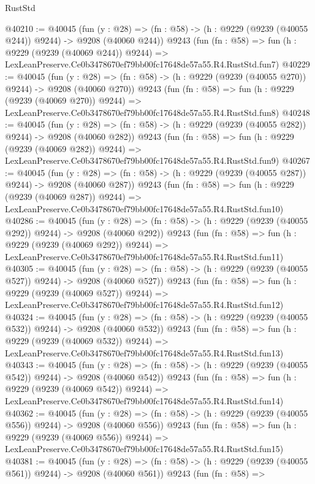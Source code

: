 \begin{lexlean}{RustStd}
\begin{coremodule}
@40210 := @40045
    (fun (y : @28) => (fn : @58) -> (h : @9229 (@9239 (@40055 @244)) @9244) -> @9208 (@40060 @244))
    @9243
    (fun (fn : @58) =>
    fun (h : @9229 (@9239 (@40069 @244)) @9244) =>
    LexLeanPreserve.Ce0b3478670ef79bb00fc17648de57a55.R4.RustStd.fun7)
@40229 := @40045
    (fun (y : @28) => (fn : @58) -> (h : @9229 (@9239 (@40055 @270)) @9244) -> @9208 (@40060 @270))
    @9243
    (fun (fn : @58) =>
    fun (h : @9229 (@9239 (@40069 @270)) @9244) =>
    LexLeanPreserve.Ce0b3478670ef79bb00fc17648de57a55.R4.RustStd.fun8)
@40248 := @40045
    (fun (y : @28) => (fn : @58) -> (h : @9229 (@9239 (@40055 @282)) @9244) -> @9208 (@40060 @282))
    @9243
    (fun (fn : @58) =>
    fun (h : @9229 (@9239 (@40069 @282)) @9244) =>
    LexLeanPreserve.Ce0b3478670ef79bb00fc17648de57a55.R4.RustStd.fun9)
@40267 := @40045
    (fun (y : @28) => (fn : @58) -> (h : @9229 (@9239 (@40055 @287)) @9244) -> @9208 (@40060 @287))
    @9243
    (fun (fn : @58) =>
    fun (h : @9229 (@9239 (@40069 @287)) @9244) =>
    LexLeanPreserve.Ce0b3478670ef79bb00fc17648de57a55.R4.RustStd.fun10)
@40286 := @40045
    (fun (y : @28) => (fn : @58) -> (h : @9229 (@9239 (@40055 @292)) @9244) -> @9208 (@40060 @292))
    @9243
    (fun (fn : @58) =>
    fun (h : @9229 (@9239 (@40069 @292)) @9244) =>
    LexLeanPreserve.Ce0b3478670ef79bb00fc17648de57a55.R4.RustStd.fun11)
@40305 := @40045
    (fun (y : @28) => (fn : @58) -> (h : @9229 (@9239 (@40055 @527)) @9244) -> @9208 (@40060 @527))
    @9243
    (fun (fn : @58) =>
    fun (h : @9229 (@9239 (@40069 @527)) @9244) =>
    LexLeanPreserve.Ce0b3478670ef79bb00fc17648de57a55.R4.RustStd.fun12)
@40324 := @40045
    (fun (y : @28) => (fn : @58) -> (h : @9229 (@9239 (@40055 @532)) @9244) -> @9208 (@40060 @532))
    @9243
    (fun (fn : @58) =>
    fun (h : @9229 (@9239 (@40069 @532)) @9244) =>
    LexLeanPreserve.Ce0b3478670ef79bb00fc17648de57a55.R4.RustStd.fun13)
@40343 := @40045
    (fun (y : @28) => (fn : @58) -> (h : @9229 (@9239 (@40055 @542)) @9244) -> @9208 (@40060 @542))
    @9243
    (fun (fn : @58) =>
    fun (h : @9229 (@9239 (@40069 @542)) @9244) =>
    LexLeanPreserve.Ce0b3478670ef79bb00fc17648de57a55.R4.RustStd.fun14)
@40362 := @40045
    (fun (y : @28) => (fn : @58) -> (h : @9229 (@9239 (@40055 @556)) @9244) -> @9208 (@40060 @556))
    @9243
    (fun (fn : @58) =>
    fun (h : @9229 (@9239 (@40069 @556)) @9244) =>
    LexLeanPreserve.Ce0b3478670ef79bb00fc17648de57a55.R4.RustStd.fun15)
@40381 := @40045
    (fun (y : @28) => (fn : @58) -> (h : @9229 (@9239 (@40055 @561)) @9244) -> @9208 (@40060 @561))
    @9243
    (fun (fn : @58) =>

\end{coremodule}
\end{lexlean}
